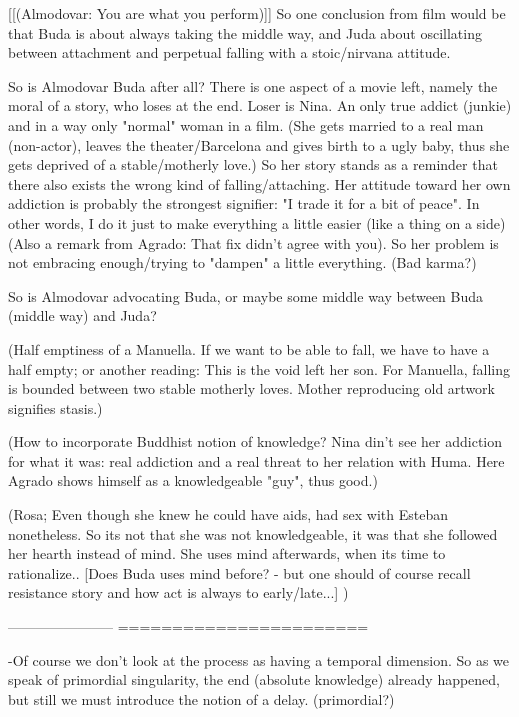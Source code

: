 \documentclass[10pt]{book}
\begin{document}
[[(Almodovar: You are what you perform)]]
So one conclusion from film would be that Buda is about always taking the middle way, and Juda about oscillating between attachment and perpetual falling with a stoic/nirvana attitude.

So is Almodovar Buda after all? There is one aspect of a movie left, namely the moral of a story, who loses at the end. Loser is Nina. An only true addict (junkie) and in a way only "normal" woman in a film. (She gets married to a real man (non-actor), leaves the theater/Barcelona and gives birth to a ugly baby, thus she gets deprived of a stable/motherly love.) So her story stands as a reminder that there also exists the wrong kind of falling/attaching. Her attitude toward her own addiction is probably the strongest signifier: "I trade it for a bit of peace". In other words, I do it just to make everything a little easier (like a thing on a side) (Also a remark from Agrado: That fix didn't agree with you). So her problem is not embracing enough/trying to "dampen" a little everything. (Bad karma?)

So is Almodovar advocating Buda, or maybe some middle way between Buda (middle way) and Juda?  

(Half emptiness of a Manuella. If we want to be able to fall, we have to have a half empty; or another reading: This is the void left her son.
For Manuella, falling is bounded between two stable motherly loves.
Mother reproducing old artwork signifies stasis.)

(How to incorporate Buddhist notion of knowledge? Nina din't see her addiction for what it was: real addiction and a real threat to her relation with Huma. Here Agrado shows himself as a knowledgeable "guy", thus good.)

(Rosa; Even though she knew he could have aids, had sex with Esteban nonetheless. So its not that she was not knowledgeable, it was that she followed her hearth instead of mind. She uses mind afterwards, when its time to rationalize.. [Does Buda uses mind before? - but one should of course recall resistance story and how act is always to early/late...] )

-----------------------
=======================

-Of course we don't look at the process as having a temporal dimension. So as we speak of primordial singularity, the end (absolute knowledge) already happened, but still we must introduce the notion of a delay. (primordial?) 
\end{document}
